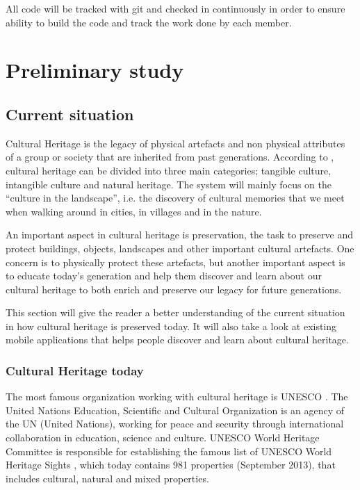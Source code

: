 \documentclass[11pt]{book}
\begin{document}
All code will be tracked with git and checked in continuously in order to ensure ability to build the code and track the work done by each member.

\chapter{Preliminary study}
\label{chap:preliminary_study}

\section{Current situation}
Cultural Heritage is the legacy of physical artefacts and non physical attributes of a group or society that are inherited from past generations. According to \cite{CiD:culturalheritage}, cultural heritage can be divided into three main categories; tangible culture, intangible culture and natural heritage. The system will mainly focus on the ``culture in the landscape'', i.e. the discovery of cultural memories that we meet when walking around in cities, in villages and in the nature.

An important aspect in cultural heritage is preservation, the task to preserve and protect buildings, objects, landscapes and other important cultural artefacts. One concern is to physically protect these artefacts, but another important aspect is to educate today's generation and help them discover and learn about our cultural heritage to both enrich and preserve our legacy for future generations.

This section will give the reader a better understanding of the current situation in how cultural heritage is preserved today. It will also take a look at existing mobile applications that helps people discover and learn about cultural heritage.

\subsection{Cultural Heritage today}
The most famous organization working with cultural heritage is UNESCO \cite{UNESCO:intro}. The United Nations Education, Scientific and Cultural Organization is an agency of the UN (United Nations), working for peace and security through international collaboration in education, science and culture. UNESCO World Heritage Committee is responsible for establishing  the famous list of UNESCO World Heritage Sights \cite{UNESCO:worldheritage}, which today contains 981 properties (September 2013), that includes cultural, natural and mixed properties.
\end{document}
